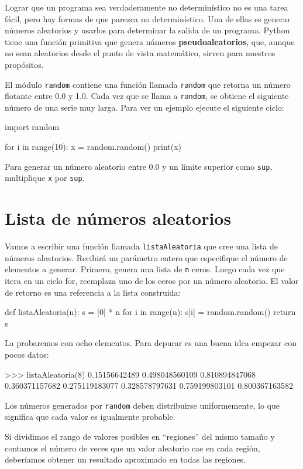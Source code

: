 Lograr que un programa sea verdaderamente no determinístico no es
una tarea fácil, pero hay formas de que parezca no determinístico.
Una de ellas es generar números aleatorios y usarlos para determinar
la salida de un programa. Python tiene una función primitiva que genera
números \textbf{pseudoaleatorios}, que, aunque no sean aleatorios
desde el punto de vista matemático, sirven para nuestros propósitos.

El módulo \texttt{random} contiene una función llamada \texttt{random}
que retorna un número flotante entre 0.0 y 1.0. Cada vez que se llama
a \texttt{random}, se obtiene el siguiente número de una serie muy
larga. Para ver un ejemplo ejecute el siguiente ciclo:
\begin{pythoncode}
import random

for i in range(10):
  x = random.random()
  print(x)
\end{pythoncode}

Para generar un número aleatorio entre 0.0 y un límite superior como
\texttt{sup}, multiplique \texttt{x} por \texttt{sup}.

\section{Lista de números aleatorios}

Vamos a escribir una función llamada \texttt{listaAleatoria} que cree
una lista de números aleatorios. Recibirá un parámetro entero que
especifique el número de elementos a generar. Primero, genera una
lista de \texttt{n} ceros. Luego cada vez que itera en un ciclo for,
reemplaza uno de los ceros por un número aleatorio. El valor de retorno
es una referencia a la lista construida:
\begin{pythoncode}
def listaAleatoria(n):
  s = [0] * n
  for i in range(n):
    s[i] = random.random()
  return s
\end{pythoncode}

La probaremos con ocho elementos. Para depurar es una buena idea empezar
con pocos datos:
\begin{pythoncode}
>>> listaAleatoria(8)
0.15156642489
0.498048560109
0.810894847068
0.360371157682
0.275119183077
0.328578797631
0.759199803101
0.800367163582
\end{pythoncode}

Los números generados por \texttt{random} deben distribuirse uniformemente,
lo que significa que cada valor es igualmente probable.

Si dividimos el rango de valores posibles en ``regiones'' del mismo
tamaño y contamos el número de veces que un valor aleatorio cae en
cada región, deberíamos obtener un resultado aproximado en todas las
regiones.

